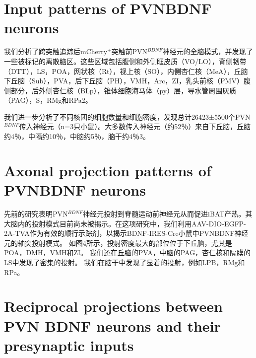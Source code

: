 \section{Input patterns of PVNBDNF neurons}
我们分析了跨突触追踪后mCherry$^{+}$突触前PVN$^{BDNF}$神经元的全脑模式，并发现了一些被标记的离散脑区。这些区域包括腹侧和外侧眶皮质（VO/LO），背侧韧带（DTT），LS，POA，网状核（Rt），视上核（SO），内侧杏仁核（MeA），丘脑下丘脑（Sub），PVA，后下丘脑（PH），VMH，Arc，ZI，乳头前核（PMV）腹侧部分，后外侧杏仁核（BLp），锥体细胞海马体（py）层，导水管周围灰质（PAG），S，RMg和RPa\figurename{2}。

我们进一步分析了不同核团的细胞数量和细胞密度，发现总计26423±5500个PVN$^{BDNF}$传入神经元（n=3只小鼠）。大多数传入神经元（约52％）来自下丘脑，丘脑约4％，中隔约10％，中脑约5％，脑干约4％\figurename{3}。

\section{Axonal projection patterns of PVNBDNF neurons}
先前的研究表明PVN$^{BDNF}$神经元投射到脊髓运动前神经元从而促进iBAT产热\citep{an2015discrete}。其大脑内的投射模式目前尚未被揭示。在这项研究中，我们利用AAV-DIO-EGFP-2A-TVA作为有效的顺行示踪剂，以揭示BDNF-IRES-Cre小鼠中PVNBDNF神经元的轴突投射模式。 如图4所示，投射密度最大的部位位于下丘脑，尤其是POA，DMH，VMH和ZI。 我们还在丘脑的PVA，中脑的PAG，杏仁核和隔膜的LS中发现了密集的投射。 我们在脑干中发现了显着的投射，例如LPB，RMg和RPa。

\section{Reciprocal projections between PVN BDNF neurons and their presynaptic inputs}